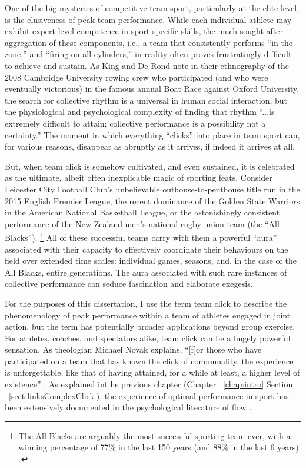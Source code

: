 \begin{CJK}{UTF8}{gbsn}
One of the big mysteries of competitive team sport, particularly at the elite level, is the elusiveness of peak team performance.  While each individual athlete may exhibit expert level competence in sport specific skills, the much sought after aggregation of these components, i.e., a team that consistently performs ``in the zone,'' and ``firing on all cylinders,'' in reality often proves frustratingly difficult to achieve and sustain.  As King and De Rond \textcite[568]{King2011} note in their ethnography of the 2008 Cambridge University rowing crew who participated (and who were eventually victorious) in the famous annual Boat Race against Oxford University, the search for collective rhythm is a universal in human social interaction, but  the physiological and psychological complexity of finding that rhythm ``...is extremely difficult to attain; collective performance is a possibility not a certainty.''   The moment in which everything ``clicks'' into place in team sport can, for various reasons, disappear as abruptly as it arrives, if indeed it arrives at all.

But, when team click is somehow cultivated, and even sustained, it is celebrated as the ultimate, albeit often inexplicable magic of sporting feats. Consider Leicester City Football Club's unbelievable outhouse-to-penthouse title run in the 2015 English Premier League, the recent dominance of the Golden State Warriors in the American National Basketball League, or the astonishingly consistent performance of the New Zealand men's national rugby union team (the ``All Blacks'').
    \footnote{The All Blacks are arguably the most successful sporting team ever, with a winning percentage of 77\% in the last 150 years (and 88\% in the last 6 years) \citep{Kerr2013}.}
All of these successful teams carry with them a powerful ``aura'' associated with their capacity to effectively coordinate their behaviours on the field over extended time scales: individual games, seasons, and, in the case of the All Blacks, entire generations.  The aura associated with such rare instances of collective performance can seduce fascination and elaborate exegesis.


For the purposes of this dissertation, I use the term team click to describe the phenomenology of peak performance within a team of athletes engaged in joint action, but the term has potentially broader applications beyond group exercise.  For athletes, coaches, and spectators alike, team click can be a hugely powerful sensation.  As theologian Michael Novak explains, ``[f]or those who have participated on a team that has known the click of communality, the experience is unforgettable, like that of having attained, for a while at least, a higher level of existence'' \citep[11]{White2011}.  As explained int he previous chapter (Chapter ~\ref{chap:intro} Section ~\ref{sect:linksComplexClick}), the experience of optimal performance in sport has been extensively documented in the psychological literature of flow \citep{Csikszentmihalyi1992,Jackson1995,Jackson1999,McNeill1995}.


\end{CJK}
